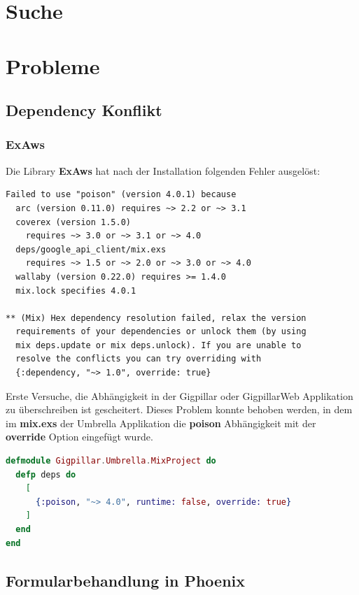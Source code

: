 \clearpage
\section{Suche}


\clearpage
\section{Probleme}

\subsection{Dependency Konflikt}

\subsubsection{ExAws}

Die Library \textbf{ExAws} hat nach der Installation folgenden Fehler ausgelöst:

\begin{lstlisting}[frame=single]
Failed to use "poison" (version 4.0.1) because
  arc (version 0.11.0) requires ~> 2.2 or ~> 3.1
  coverex (version 1.5.0)
    requires ~> 3.0 or ~> 3.1 or ~> 4.0
  deps/google_api_client/mix.exs
    requires ~> 1.5 or ~> 2.0 or ~> 3.0 or ~> 4.0
  wallaby (version 0.22.0) requires >= 1.4.0
  mix.lock specifies 4.0.1

** (Mix) Hex dependency resolution failed, relax the version
  requirements of your dependencies or unlock them (by using
  mix deps.update or mix deps.unlock). If you are unable to
  resolve the conflicts you can try overriding with
  {:dependency, "~> 1.0", override: true}
\end{lstlisting}

Erste Versuche, die Abhängigkeit in der Gigpillar oder GigpillarWeb Applikation
zu überschreiben ist gescheitert.
Dieses Problem konnte behoben werden, in dem im \textbf{mix.exs} der Umbrella
Applikation die \textbf{poison} Abhängigkeit mit der \textbf{override} Option
eingefügt wurde.

\begin{lstlisting}[language=elixir,frame=single]
defmodule Gigpillar.Umbrella.MixProject do
  defp deps do
    [
      {:poison, "~> 4.0", runtime: false, override: true}
    ]
  end
end
\end{lstlisting}

\subsection{Formularbehandlung in Phoenix}

